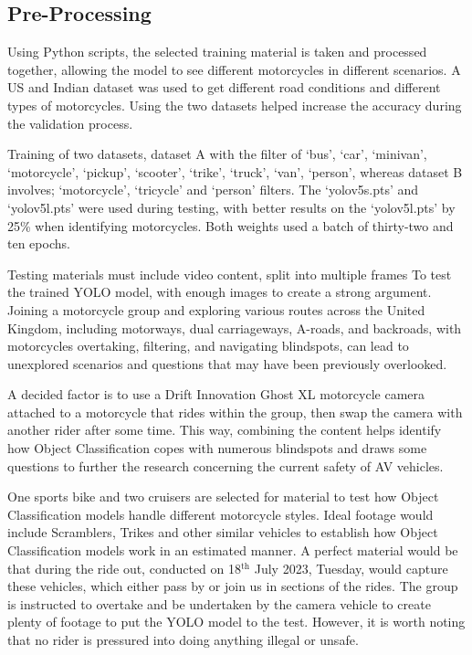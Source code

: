 \documentclass[conference]{IEEEtran}
\begin{document}
	\subsection{Pre-Processing}
	\label{subsec:preprocessing}
		Using Python scripts, the selected training material is taken and processed together, allowing the model to see different motorcycles in different scenarios. A US and Indian dataset was used to get different road conditions and different types of motorcycles. Using the two datasets helped increase the accuracy during the validation process.

		Training of two datasets, dataset A with the filter of `bus', `car', `minivan', `motorcycle', `pickup', `scooter', `trike', `truck', `van', `person', whereas dataset B involves; `motorcycle', `tricycle' and `person' filters. The `yolov5s.pts' and `yolov5l.pts' were used during testing, with better results on the `yolov5l.pts' by 25\% when identifying motorcycles. Both weights used a batch of thirty-two and ten epochs.

		Testing materials must include video content, split into multiple frames To test the trained YOLO model, with enough images to create a strong argument. Joining a motorcycle group and exploring various routes across the United Kingdom, including motorways, dual carriageways, A-roads, and backroads, with motorcycles overtaking, filtering, and navigating blindspots, can lead to unexplored scenarios and questions that may have been previously overlooked.
					
		A decided factor is to use a Drift Innovation Ghost XL motorcycle camera attached to a motorcycle that rides within the group, then swap the camera with another rider after some time. This way, combining the content helps identify how Object Classification copes with numerous blindspots and draws some questions to further the research concerning the current safety of AV vehicles. 
		
		One sports bike and two cruisers are selected for material to test how Object Classification models handle different motorcycle styles. Ideal footage would include Scramblers, Trikes and other similar vehicles to establish how Object Classification models work in an estimated manner. A perfect material would be that during the ride out, conducted on 18$^\text{th}$ July 2023, Tuesday, would capture these vehicles, which either pass by or join us in sections of the rides. The group is instructed to overtake and be undertaken by the camera vehicle to create plenty of footage to put the YOLO model to the test. However, it is worth noting that no rider is pressured into doing anything illegal or unsafe.
\end{document}
